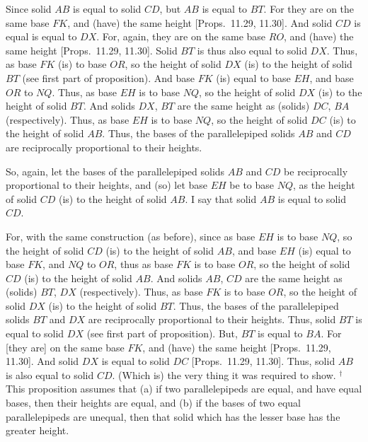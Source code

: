 Since solid $AB$ is equal to solid $CD$, but $AB$ is equal
to $BT$. For they are on the same base $FK$, and (have) the
same height [Props.~11.29, 11.30]. And solid $CD$ is equal is equal to $DX$. For, again,  they are on the same base $RO$, and (have) the same height [Props.~11.29, 11.30]. Solid
$BT$ is thus also equal to solid $DX$. Thus, as base $FK$ (is) to base $OR$,
so the height of solid $DX$ (is) to the height of solid $BT$ (see first part of 
proposition). And base
$FK$ (is) equal to base $EH$, and base $OR$ to $NQ$. Thus, as base
$EH$ is to base $NQ$, so the height of solid $DX$ (is) to the height
of solid $BT$. And solids $DX$, $BT$ are the same
height as (solids) $DC$,  $BA$ (respectively). Thus, as base $EH$
is to base $NQ$, so the height of solid $DC$ (is) to the height of solid
$AB$.  Thus, the bases of the parallelepiped solids $AB$ and $CD$
are reciprocally proportional to their heights.

So, again, let the bases of the parallelepiped solids $AB$ and $CD$ be
reciprocally proportional to their heights, and (so) let base $EH$ be to base $NQ$,
as the height of solid $CD$ (is) to the height of solid $AB$. I say
that solid $AB$ is equal to solid $CD$.

For, with the same construction (as before), since as base $EH$
is to base $NQ$, so the height of solid $CD$ (is) to the height
of solid $AB$, and base $EH$ (is) equal to base $FK$, and
$NQ$ to $OR$, thus as base $FK$ is to base $OR$, so the height
of solid $CD$ (is) to the height of solid $AB$. And solids $AB$, $CD$ are the same height as (solids) $BT$,  $DX$ (respectively). 
Thus, as base $FK$ is to base $OR$, so the height of solid $DX$ (is)
to the height of solid $BT$. Thus, the bases of the parallelepiped solids $BT$ and $DX$
are reciprocally proportional to their heights. Thus, solid $BT$ is equal to
solid $DX$ (see first part of  proposition). But, $BT$ is equal to $BA$. For [they are] on the same
base $FK$, and (have) the same height [Props.~11.29, 11.30]. And solid $DX$ is equal
to solid $DC$ [Props.~11.29, 11.30]. Thus, solid $AB$ is also equal to solid $CD$. (Which is) the very thing it was required to show.
{\footnotesize\noindent$^\dag$ This proposition assumes that (a) if
two parallelepipeds are equal, and have equal bases, then their heights are equal,
and (b) if the bases of two equal parallelepipeds are unequal, then that solid which
has the lesser base has the greater height.}


